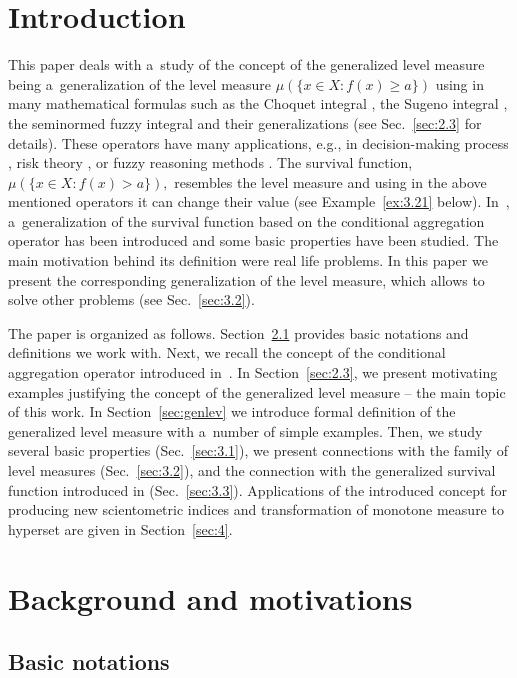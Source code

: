 \documentclass[preprint,11pt]{elsarticle}
\theoremstyle{definition}
\renewcommand\ge{\geqslant}
\begin{document}
\section{Introduction}\label{sec:1}
This paper deals with a~study of the concept of the generalized level measure being a~generalization of the level measure  $\mu(\{x\in X\colon f(x)\ge a\})$ using in many mathematical formulas such as the Choquet integral \cite{choquet}, the Sugeno integral \cite{sug74}, the seminormed fuzzy integral \cite{BHH} and their generalizations \cite{BHH19,lucca2017,MesSt19} (see Sec.~\ref{sec:2.3} for details).
These operators have many applications, e.g., in decision-making process \cite{grabisch1996},  risk theory \cite{kal17}, or fuzzy reasoning methods \cite{lucca2017}.
The survival function, $\mu(\{x\in X\colon f(x)>a\}),$ resembles the level measure and using in the above mentioned operators it can change their value (see Example~\ref{ex:3.21} below).
In~\cite{BHHK21}, a~generalization of the survival function  based on the conditional aggregation operator has been introduced and some basic properties have been studied.
The main motivation behind its definition were real life problems.
In this paper we present the corresponding generalization of the level measure, which allows to solve other problems (see Sec.~\ref{sec:3.2}).


The paper is organized as follows.
Section~\ref{sec:2.1} provides basic notations and definitions we work with.
Next, we recall the concept of the conditional aggregation operator introduced in~\cite{BHHK21}. In Section~\ref{sec:2.3}, we present motivating examples justifying the concept of the generalized level measure -- the main topic of this work.
In Section~\ref{sec:genlev} we introduce formal definition of the generalized level measure with a~number of simple examples.
Then, we study several basic properties (Sec.~\ref{sec:3.1}), we present connections with the family of level measures  (Sec.~\ref{sec:3.2}), and the connection with the generalized survival function introduced in \cite[Sec.~4]{BHHK21} (Sec.~\ref{sec:3.3}). Applications of the introduced concept for producing new scientometric indices and transformation of monotone measure to hyperset are given in Section~\ref{sec:4}.


\section{Background and motivations}\label{sec:2}


\subsection{\textbf{Basic notations}}\label{sec:2.1}
\end{document}
